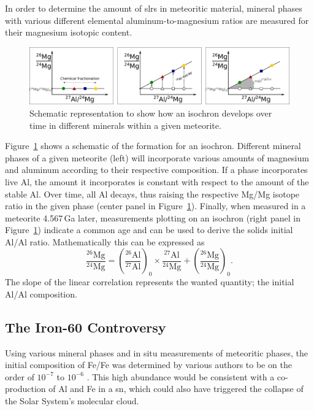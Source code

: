 In order to determine the amount of \acp{slr} in meteoritic material, mineral phases with various different elemental aluminum-to-magnesium ratios are measured for their magnesium isotopic content. 
\begin{figure}[tb]
    \centering
    \includegraphics[width=\textwidth]{graphics/massive_stars/al26_isochron}
    \caption{Schematic representation to show how an isochron develops over time in different minerals within a given meteorite.}
    \label{fig:massive_stars:al26_isochron}
\end{figure}
Figure~\ref{fig:massive_stars:al26_isochron} shows a schematic of the formation for an isochron. Different mineral phases of a given meteorite (left) will incorporate various amounts of magnesium and aluminum according to their respective composition. If a phase incorporates live Al, the amount it incorporates is constant with respect to the amount of the stable Al. Over time, all Al decays, thus raising the respective Mg/Mg isotope ratio in the given phase (center panel in Figure~\ref{fig:massive_stars:al26_isochron}). Finally, when measured in a meteorite 4.567\,Ga later, measurements plotting on an isochron (right panel in Figure~\ref{fig:massive_stars:al26_isochron}) indicate a common age and can be used to derive the solids initial Al/Al ratio. Mathematically this can be expressed as
\begin{equation}
    \frac{^{26}\mathrm{Mg}}{^{24}\mathrm{Mg}} = \left(\frac{^{26}\mathrm{Al}}{^{27}\mathrm{Al}}\right)_0 \times \frac{^{27}\mathrm{Al}}{^{24}\mathrm{Mg}} + \left(\frac{^{26}\mathrm{Mg}}{^{24}\mathrm{Mg}}\right)_0.
\end{equation}
The slope of the linear correlation represents the wanted quantity; the initial Al/Al composition.


\subsection{The Iron-60 Controversy}

Using various mineral phases and in situ measurements of meteoritic phases, the initial composition of Fe/Fe was determined by various authors to be on the order of $10^{-7}$ to $10^{-6}$ \citep[e.g.,][]{mishra14,telus18}. This high abundance would be consistent with a co-production of Al and Fe in a \ac{sn}, which could also have triggered the collapse of the Solar System's molecular cloud.

